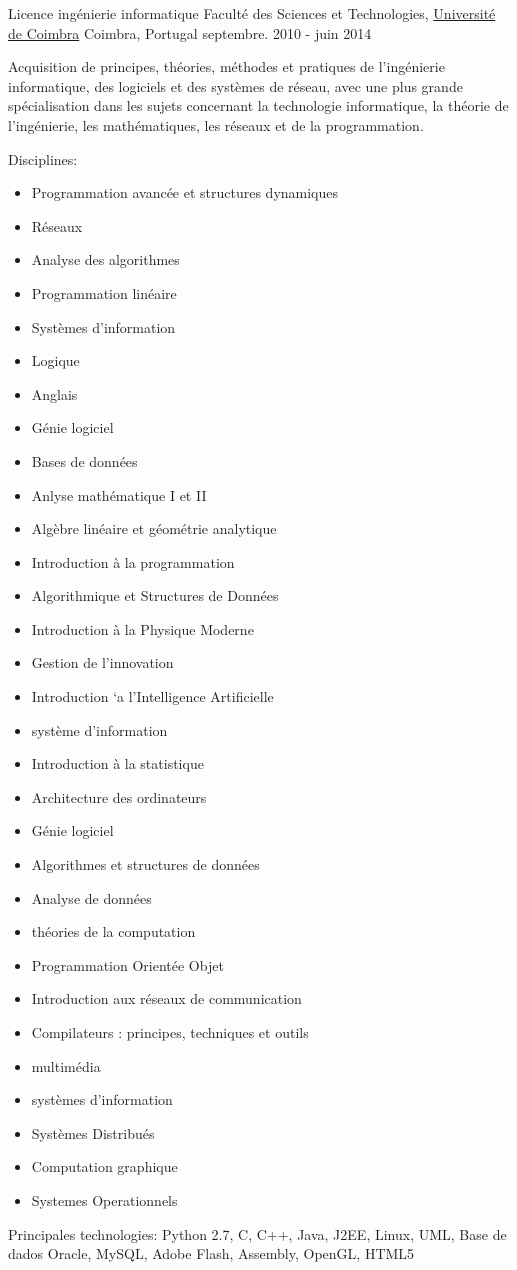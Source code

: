 \begin{cventries}
\cventry
{Licence ingénierie informatique} %
{Faculté des Sciences et Technologies, \href{https://www.uc.pt/}{Université de Coimbra}} %
{Coimbra, Portugal} %
{septembre. 2010 - juin 2014} %
{  %
\begin{cvitems}
\item {Acquisition de principes, théories, méthodes et pratiques de l'ingénierie informatique, des logiciels et des systèmes de réseau, avec une plus grande spécialisation dans les sujets concernant la technologie informatique, la théorie de l'ingénierie, les mathématiques, les réseaux et de la programmation.}
\item{Disciplines:}
\begin{itemize}
\item Programmation avancée et structures dynamiques
\item Réseaux
\item Analyse des algorithmes
\item Programmation linéaire
\item Systèmes d’information
\item Logique
\item Anglais
\item Génie logiciel
\item Bases de données
\item Anlyse mathématique I et II
\item Algèbre linéaire et géométrie analytique
\item Introduction à la programmation
\item Algorithmique et Structures de Données
\item Introduction à la Physique Moderne
\item Gestion de l'innovation
\item Introduction `a l'Intelligence Artificielle
\item système d'information
\item Introduction à la statistique
\item Architecture des ordinateurs
\item Génie logiciel
\item Algorithmes et structures de données
\item Analyse de données
\item théories de la computation
\item Programmation Orientée Objet
\item Introduction aux réseaux de communication
\item Compilateurs : principes, techniques et outils
\item multimédia
\item systèmes d'information
\item Systèmes Distribués
\item Computation graphique
\item Systemes Operationnels
\end{itemize}
\item{Principales technologies: Python 2.7, C, C++, Java, J2EE, Linux, UML, Base de dados Oracle, MySQL, Adobe Flash, Assembly, OpenGL, HTML5 }
\end{cvitems}
}



\end{cventries}
